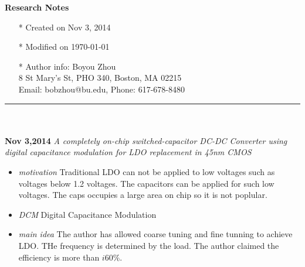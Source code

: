 \documentclass[]{article}
\begin{document}
\pagestyle{empty}
{\large\textbf{Research Notes}}
\begin{itemize}
    \item[*] Created on Nov 3, 2014
    \item[*] Modified on \today
    \item[*] Author info: Boyou Zhou\\
             8 St Mary's St, PHO 340, Boston, MA 02215\\
             Email: bobzhou@bu.edu, Phone: 617-678-8480
\end{itemize}


\rule[-0.1cm]{7.5in}{0.01cm}\\
\\
\noindent \textbf{Nov 3,2014}
\textit{A completely on-chip switched-capacitor DC-DC Converter using digital
capacitance modulation for LDO replacement in 45nm CMOS}
\indent		\begin{itemize}
            \item \textit{motivation} Traditional LDO can not be applied to low
            voltages such as voltages below 1.2 voltages. The capacitors can be
            applied for such low voltages. The caps occupies a large area on
            chip so it is not poplular.
            \item \textit{DCM} Digital Capacitance Modulation
            \item \textit{main idea} The author has allowed coarse tuning and
            fine tunning to achieve LDO. THe frequency is determined by the
            load. The author claimed the efficiency is more than $i60\%$.
        \end{itemize}
\end{document}
